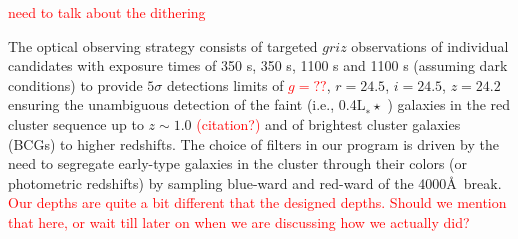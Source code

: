 \documentclass[apj, revtex4]{emulateapj}
\newcommand{\editorial}[1]{\textcolor{red}{#1}}
\begin{document}
\editorial{need to talk about the dithering}

The optical observing strategy consists of targeted $griz$ observations of individual candidates with exposure times of 350 s, 350 s, 1100 s and 1100 s (assuming dark conditions) to provide $5\sigma$ detections limits of \editorial{$g=??$}, $r = 24.5$, $i = 24.5$, $z = 24.2$ ensuring the unambiguous detection of the faint (i.e., 0.4L$_∗\star$ ) galaxies in the red cluster sequence up to $z \sim 1.0$ \editorial{(citation?)} and of brightest cluster galaxies (BCGs) to higher redshifts. The choice of filters in our program is driven by the need to segregate early-type galaxies in the cluster through their colors (or photometric redshifts) by sampling blue-ward and red-ward of the 4000\AA\ break. \editorial{Our depths are quite a bit different that the designed depths. Should we mention that here, or wait till later on when we are discussing how we actually did?}
\end{document}
